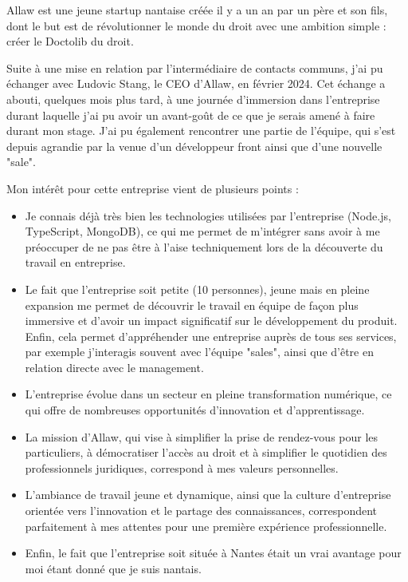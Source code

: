 Allaw est une jeune startup nantaise créée il y a un an par un père et son fils,
dont le but est de révolutionner le monde du droit avec une ambition simple :
créer le Doctolib du droit.

Suite à une mise en relation par l'intermédiaire de contacts communs, j'ai pu
échanger avec Ludovic Stang, le CEO d'Allaw, en février 2024. Cet échange a
abouti, quelques mois plus tard, à une journée d'immersion dans l'entreprise
durant laquelle j'ai pu avoir un avant-goût de ce que je serais amené à faire
durant mon stage. J'ai pu également rencontrer une partie de l'équipe, qui s'est
depuis agrandie par la venue d'un développeur front ainsi que d'une nouvelle
"sale".

Mon intérêt pour cette entreprise vient de plusieurs points :
\begin{itemize}
  \item Je connais déjà très bien les technologies utilisées par l'entreprise (Node.js,
TypeScript, MongoDB), ce qui me permet de m'intégrer sans avoir à me préoccuper
de ne pas être à l'aise techniquement lors de la découverte du travail en
entreprise.

  \item Le fait que l'entreprise soit petite (10 personnes), jeune mais en pleine
expansion me permet de découvrir le travail en équipe de façon plus immersive
et d'avoir un impact significatif sur le développement du produit. Enfin, cela
permet d'appréhender une entreprise auprès de tous ses services, par exemple
j'interagis souvent avec l'équipe "sales", ainsi que d'être en relation directe
avec le management.

  \item L'entreprise évolue dans un secteur en pleine transformation numérique,
ce qui offre de nombreuses opportunités d'innovation et d'apprentissage.

  \item La mission d'Allaw, qui vise à simplifier la prise de rendez-vous pour les
particuliers, à démocratiser l'accès au droit et à simplifier le quotidien des
professionnels juridiques, correspond à mes valeurs personnelles.

  \item L'ambiance de travail jeune et dynamique, ainsi que la culture d'entreprise
orientée vers l'innovation et le partage des connaissances, correspondent
parfaitement à mes attentes pour une première expérience professionnelle.

  \item Enfin, le fait que l'entreprise soit située à Nantes était un vrai
avantage pour moi étant donné que je suis nantais.
\end{itemize}

